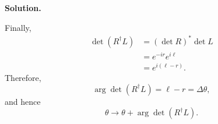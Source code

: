 \documentclass[a4paper,11pt]{article}
\newenvironment{solution}{\par\medskip\noindent\textbf{Solution.}\par\smallskip}{\par\medskip}
\begin{document}
\begin{solution}
Finally,
\begin{equation}
\begin{aligned}
    \det(R^\dagger L)
    &=(\det R)^*\det L\\
    &=e^{-ir}e^{i\ell}\\
    &=e^{i(\ell-r)}.
\end{aligned}
\end{equation}
Therefore,
\begin{equation}
    \arg\det(R^\dagger L)=\ell-r=\Delta\theta,
\end{equation}
and hence
\begin{equation}
    \boxed{
        \theta\to\theta+\arg\det(R^\dagger L)
    }.
\end{equation}
\end{solution}
\end{document}
